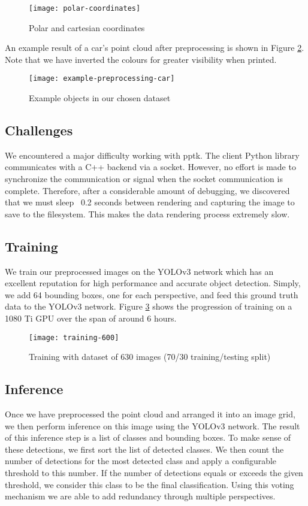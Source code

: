 \documentclass[runningheads,a4paper]{llncs}
\begin{document}
\begin{figure}[h]
  \caption{Polar and cartesian coordinates}
  \centering
  \texttt{[image: polar-coordinates]}
  \label{fig:polar-coordinates}
\end{figure}

An example result of a car’s point cloud after preprocessing is shown in Figure
\ref{fig:example-preprocessing}. Note that we have inverted the colours for greater
visibility when printed.

\begin{figure}[h]
  \caption{Example objects in our chosen dataset}
  \centering
  \texttt{[image: example-preprocessing-car]}
  \label{fig:example-preprocessing}
\end{figure}

\subsection{Challenges}
We encountered a major difficulty working with pptk. The client Python library
communicates with a C++ backend via a socket. However, no effort is made to
synchronize the communication or signal when the socket communication is
complete. Therefore, after a considerable amount of debugging, we discovered
that we must sleep ~0.2 seconds between rendering and capturing the image to
save to the filesystem. This makes the data rendering process extremely slow.

\subsection{Training}
We train our preprocessed images on the YOLOv3 network \cite{redmon2016you} which 
has an excellent reputation for high performance and accurate object detection. 
Simply, we add 64 bounding boxes, one for each perspective, and feed this ground 
truth data to the YOLOv3 network. Figure \ref{fig:training-600} shows the progression
of training on a 1080 Ti GPU over the span of around 6 hours.

\begin{figure}[h]
  \caption{Training with dataset of 630 images (70/30 training/testing split)}
  \centering
  \texttt{[image: training-600]}
  \label{fig:training-600}
\end{figure}

\subsection{Inference}
Once we have preprocessed the point cloud and arranged it into an image grid, we
then perform inference on this image using the YOLOv3 network. The result of this
inference step is a list of classes and bounding boxes. To make sense of these
detections, we first sort the list of detected classes. We then count the number
of detections for the most detected class and apply a configurable threshold
to this number. If the number of detections equals or exceeds the given threshold,
we consider this class to be the final classification. Using this voting
mechanism we are able to add redundancy through multiple perspectives.
\end{document}
